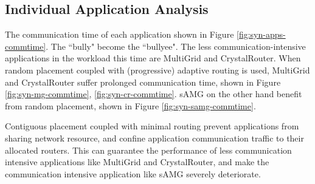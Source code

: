 \documentclass[conference,compsoc]{IEEEtran}
\begin{document}
\subsection{Individual Application Analysis}

The communication time of each application shown in Figure \ref{fig:syn-apps-commtime}. The ``bully" become the ``bullyee". The less communication-intensive applications in the workload this time are  MultiGrid and CrystalRouter.  When random placement coupled with (progressive) adaptive routing is used, MultiGrid and CrystalRouter suffer prolonged communication time, shown in Figure \ref{fig:syn-mg-commtime}, \ref{fig:syn-cr-commtime}. sAMG on the other hand benefit from random placement, shown in Figure \ref{fig:syn-samg-commtime}. 

Contiguous placement coupled with minimal routing prevent applications from sharing network resource, and confine application communication traffic to their allocated routers. This can guarantee the performance of less communication intensive applications like MultiGrid and CrystalRouter, and make the communication intensive application like sAMG severely deteriorate. 
\end{document}
